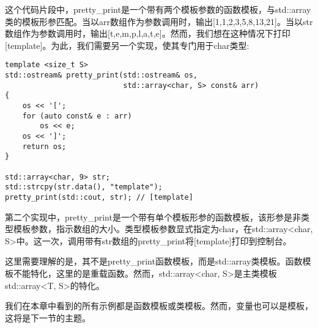 这个代码片段中，pretty\_print是一个带有两个模板参数的函数模板，与std::array类的模板形参匹配。当以arr数组作为参数调用时，输出[1,1,2,3,5,8,13,21]。当以str数组作为参数调用时，输出[t,e,m,p,l,a,t,e]。然而，我们想在这种情况下打印[template]。为此，我们需要另一个实现，使其专门用于char类型:

\begin{lstlisting}[style=styleCXX]
template <size_t S>
std::ostream& pretty_print(std::ostream& os,
						   std::array<char, S> const& arr)
{
	os << '[';
	for (auto const& e : arr)
		os << e;
	os << ']';
	return os;
}

std::array<char, 9> str;
std::strcpy(str.data(), "template");
pretty_print(std::cout, str); // [template]
\end{lstlisting}

第二个实现中，pretty\_print是一个带有单个模板形参的函数模板，该形参是非类型模板参数，指示数组的大小。类型模板参数显式指定为char，在std::array<char, S>中。这一次，调用带有str数组的pretty\_print将[template]打印到控制台。

这里需要理解的是，其不是pretty\_print函数模板，而是std::array类模板。函数模板不能特化，这里的是重载函数。然而，std::array<char, S>是主类模板std::array<T, S>的特化。

我们在本章中看到的所有示例都是函数模板或类模板。然而，变量也可以是模板，这将是下一节的主题。


